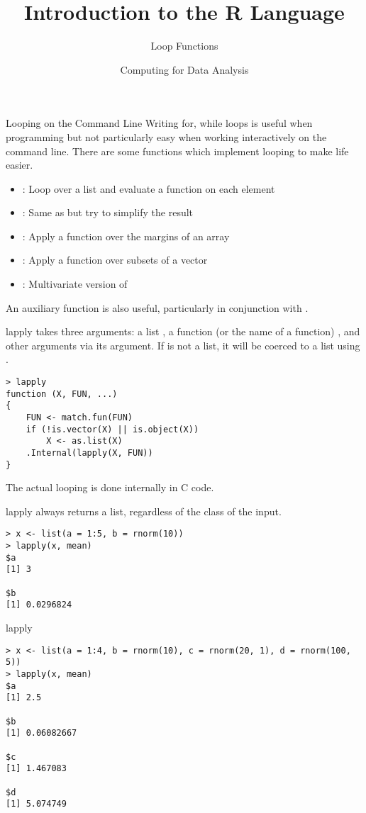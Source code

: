 \documentclass[aspectratio=169]{beamer}
\title[The R Language]{Introduction to the R Language}
\subtitle{Loop Functions}
\date{Computing for Data Analysis}
\begin{document}
\begin{frame}
  \titlepage
\end{frame}

\begin{frame}{Looping on the Command Line}
Writing for, while loops is useful when programming but not
particularly easy when working interactively on the command line.
There are some functions which implement looping to make life easier.
\begin{itemize}
\item
{}:  Loop over a list and evaluate a function on each element
\item
{}:  Same as  but try to simplify the result
\item
{}:  Apply a function over the margins of an array
\item
{}:  Apply a function over subsets of a vector
\item
{}:  Multivariate version of 
\end{itemize}
An auxiliary function  is also useful, particularly in
conjunction with .
\end{frame}

\begin{frame}[fragile]{lapply}
 takes three arguments: a list , a function (or
the name of a function) , and other arguments via its
 argument.  If  is not a list, it will be coerced to
a list using .
\begin{verbatim}
> lapply
function (X, FUN, ...) 
{
    FUN <- match.fun(FUN)
    if (!is.vector(X) || is.object(X)) 
        X <- as.list(X)
    .Internal(lapply(X, FUN))
}
\end{verbatim}
The actual looping is done internally in C code.
\end{frame}


\begin{frame}[fragile]{lapply}
 always returns a list, regardless of the class of the
input.
\begin{verbatim}
> x <- list(a = 1:5, b = rnorm(10))
> lapply(x, mean)
$a
[1] 3

$b
[1] 0.0296824
\end{verbatim}
\end{frame}


\begin{frame}[fragile]{lapply}
\begin{verbatim}
> x <- list(a = 1:4, b = rnorm(10), c = rnorm(20, 1), d = rnorm(100, 5))
> lapply(x, mean)
$a
[1] 2.5

$b
[1] 0.06082667

$c
[1] 1.467083

$d
[1] 5.074749
\end{verbatim}
\end{frame}
\end{document}
